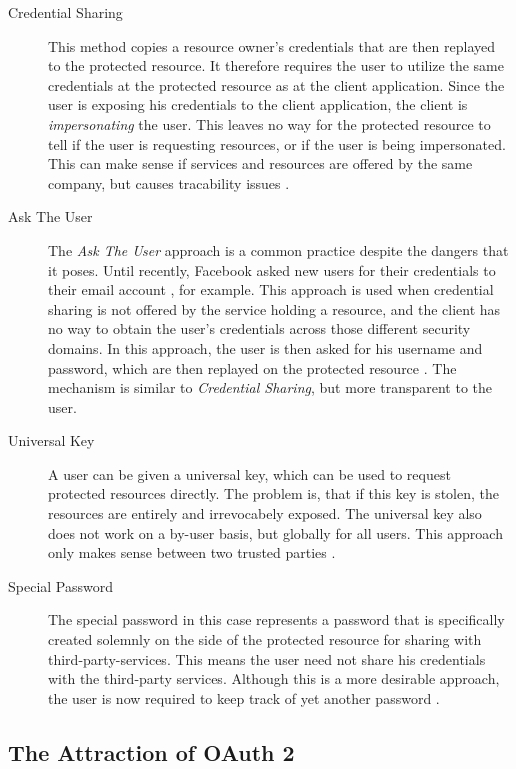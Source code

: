 \begin{description}
    \item[Credential Sharing] This method copies a resource owner's credentials that are then replayed to the protected resource. It therefore requires the user to utilize the same credentials at the protected resource as at the client application. Since the user is exposing his credentials to the client application, the client is \textit{impersonating} the user. This leaves no way for the protected resource to tell if the user is requesting resources, or if the user is being impersonated. This can make sense if services and resources are offered by the same company, but causes tracability issues \cite[p. 7]{oauth2-in-action}.
    \item[Ask The User] The \textit{Ask The User} approach is a common practice despite the dangers that it poses. Until recently, Facebook asked new users for their credentials to their email account \cite{endgadget-facebook}, for example. This approach is used when credential sharing is not offered by the service holding a resource, and the client has no way to obtain the user's credentials across those different security domains. In this approach, the user is then asked for his username and password, which are then replayed on the protected resource \cite[p. 8]{oauth2-in-action}. The mechanism is similar to \textit{Credential Sharing}, but more transparent to the user.
    \item[Universal Key] A user can be given a universal key, which can be used to request protected resources directly. The problem is, that if this key is stolen, the resources are entirely and irrevocabely exposed. The universal key also does not work on a by-user basis, but globally for all users. This approach only makes sense between two trusted parties \cite[p. 10]{oauth2-in-action}.
    \item[Special Password] The special password in this case represents a password that is specifically created solemnly on the side of the protected resource for sharing with third-party-services. This means the user need not share his credentials with the third-party services. Although this is a more desirable approach, the user is now required to keep track of yet another password \cite[p. 10]{oauth2-in-action}.
\end{description}

\subsection{The Attraction of OAuth 2}

